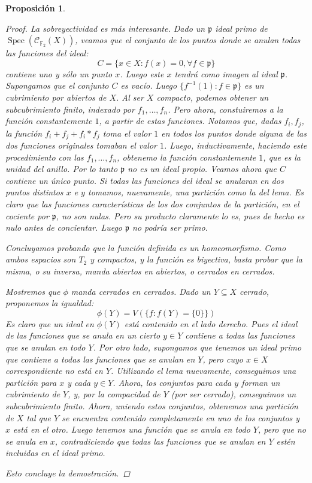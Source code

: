 \documentclass[11pt,a4paper, spanish,oneside,fleqn]{article}
\newtheorem{prop}[teo]{Proposición}
\theoremstyle{definition}
\newcommand{\FF}{\mathbb{F}}
\DeclareMathOperator{\spec}{Spec}
\begin{document}
\begin{prop}
\begin{proof}
La sobreyectividad es m\'as interesante. Dado un $\mathfrak{p}$ ideal
primo de $\spec(\mathscr{C}_{\FF_2}(X))$, veamos que el conjunto de los
puntos donde se anulan todas las funciones del ideal:
$$ C = \{x\in X : f(x) = 0, \forall f \in \mathfrak{p}\}$$
contiene uno y s\'olo un punto $x$. Luego este $x$ tendr\'a como imagen al ideal $\mathfrak{p}$.
Supongamos que el conjunto $C$ es vac\'io. Luego $\{f^{-1}(1) : f \in \mathfrak{p}\}$ es un
cubrimiento por abiertos de $X$. Al ser $X$ compacto, podemos obtener un subcubrimiento finito,
indexado por $f_1,\ldots,f_n$. Pero ahora, constuiremos a la funci\'on constantemente
$1$, a partir de estas funciones. Notamos que, dadas $f_i,f_j$, la funci\'on $f_i + f_j + f_i * f_j$ toma
el valor $1$ en todos los puntos donde alguna de las dos funciones originales tomaban el valor $1$.
Luego, inductivamente, haciendo este procedimiento con las $f_1,\ldots,f_n$, obtenemo
la funci\'on constantemente $1$, que es la unidad del anillo. Por lo tanto $\mathfrak{p}$ no es
un ideal propio.
Veamos ahora que $C$ contiene un \'unico punto. Si todas las funciones del ideal se anularan en dos
puntos distintos $x$ e $y$ tomamos, nuevamente, una partici\'on como la del lema.
Es claro que las funciones caracter\'isticas de los dos conjuntos de la partici\'on,
en el cociente por $\mathfrak{p}$, no son nulas. Pero su producto
claramente lo es, pues de hecho es nulo antes de concientar. Luego $\mathfrak{p}$ no podr\'ia ser
primo.

Concluyamos probando que la funci\'on definida es un homeomorfismo.
Como ambos espacios son $T_2$ y compactos, y la funci\'on es biyectiva, basta probar
que la misma, o su inversa, manda abiertos en abiertos, o cerrados en cerrados.

Mostremos que $\phi$ manda cerrados en cerrados. Dado un $Y\subseteq X$ cerrado,
proponemos la igualdad:
$$\phi(Y) = V(\{f : f(Y) = \{0\}\})$$
Es claro que un ideal en $\phi(Y)$ est\'a contenido en el lado derecho. Pues
el ideal de las funciones que se anula en un cierto $y\in Y$ contiene a todas las funciones
que se anulan en todo $Y$.
Por otro lado, supongamos que tenemos un ideal primo que contiene a todas las funciones que
se anulan en $Y$, pero cuyo $x\in X$ correspondiente no est\'a en $Y$.
Utilizando el lema nuevamente, conseguimos una partici\'on para $x$ y cada $y\in Y$.
Ahora, los conjuntos para cada $y$ forman un cubrimiento de $Y$, y, por la compacidad de $Y$
(por ser cerrado), conseguimos un subcubrimiento finito. Ahora, uniendo estos conjuntos, obtenemos
una partici\'on de $X$ tal que $Y$ se encuentra contenido completamente en uno de los conjuntos
y $x$ est\'a en el otro. Luego tenemos una funci\'on que se anula en todo $Y$, pero que no se
anula en $x$, contradiciendo que todas las funciones que se anulan en $Y$ est\'en incluidas
en el ideal primo.

Esto concluye la demostraci\'on.
\end{proof}
\end{prop}
\end{document}
